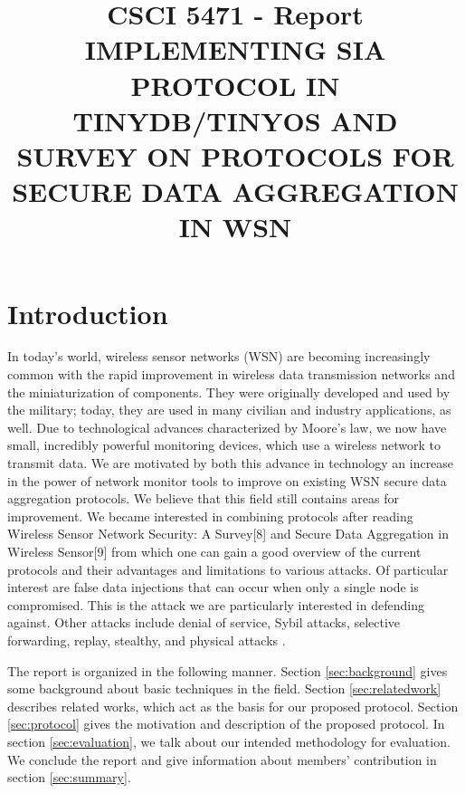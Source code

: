 \documentclass[a4paper]{article}
\title{CSCI 5471 - Report\\
IMPLEMENTING SIA PROTOCOL IN TINYDB/TINYOS AND \\
SURVEY ON PROTOCOLS FOR SECURE DATA AGGREGATION IN WSN}
\begin{document}
%
\maketitle

%



%
\section{Introduction}
\label{sec:intro}

In today's world, wireless sensor networks (WSN) are becoming increasingly
common with the rapid improvement in wireless data transmission networks and
the miniaturization of components. They were originally developed and used by
the military; today, they are used in many civilian and industry applications,
as well. Due to technological advances characterized by Moore's law, we now
have small, incredibly powerful monitoring devices, which use a wireless
network to transmit data. We are motivated by both this advance in technology
an increase in the power of network monitor tools to improve on existing WSN
secure data aggregation protocols. We believe that this field still contains
areas for improvement. We became interested in combining protocols after
reading Wireless Sensor Network Security: A Survey[8] and Secure Data
Aggregation in Wireless Sensor[9] from which one can gain a good overview of
the current protocols and their advantages and limitations to various
attacks. Of particular interest are false data injections that can occur when
only a single node is compromised. This is the attack we are particularly
interested in defending against. Other attacks include denial of service,
Sybil attacks, selective forwarding, replay, stealthy, and physical attacks
\cite{Alzaid08}.

The report is organized in the following manner. Section \ref{sec:background}
gives some background about basic techniques in the field. Section 
\ref{sec:relatedwork} describes related works, which act as the basis
for our proposed protocol. Section \ref{sec:protocol} gives
the motivation and description of the proposed protocol. In section
\ref{sec:evaluation}, we talk about our intended methodology
for evaluation. We conclude the report and give information
about members' contribution in section \ref{sec:summary}.
\end{document}
